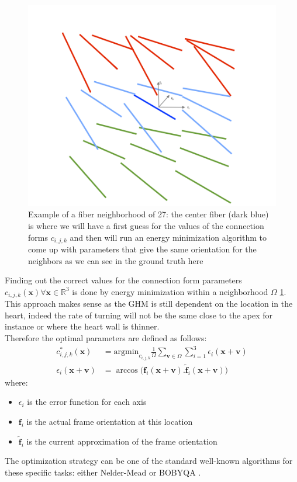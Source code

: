 \begin{figure}[h!]
    \centering
    \includegraphics[width=.5\textwidth]{figures/fibers_neighborhood3d}
    \caption{Example of a fiber neighborhood of 27: the center fiber (dark blue) is where we will have a first guess for the values of the connection forms $c_{i,j,k}$ and then will run an energy minimization algorithm to come up with parameters that give the same orientation for the neighbors as we can see in the ground truth here}
    \label{fig:fibers_neighborhood3d}
\end{figure}

Finding out the correct values for the connection form parameters $c_{i,j,k}(\mathbf{x}) \forall \mathbf{x} \in \mathbb{R}^3$ is done by energy minimization within a neighborhood $\Omega$ \ref{fig:fibers_neighborhood3d}. This approach makes sense as the GHM is still dependent on the location in the heart, indeed the rate of turning will not be the same close to the apex for instance or where the heart wall is thinner.\\
Therefore the optimal parameters are defined as follows:
\begin{align*}
    c^*_{i,j,k}(\mathbf{x}) &= \text{argmin}_{c_{i,j,k}} \frac{1}{\Omega} \sum_{\mathbf{v} \in \Omega} \sum_{i = 1}^3 \epsilon_i(\mathbf{x} + \mathbf{v}) \\
    \epsilon_i(\mathbf{x} + \mathbf{v}) &= \arccos \Big( \mathbf{f}_i(\mathbf{x} + \mathbf{v}) . \mathbf{\tilde{f}}_i(\mathbf{x} + \mathbf{v}) \Big)
\end{align*}
where:
\begin{itemize}
    \item $\epsilon_i$ is the error function for each axis 
    \item $\mathbf{f}_i$ is the actual frame orientation at this location
    \item $\mathbf{\tilde{f}}_i$ is the current approximation of the frame orientation
\end{itemize}
The optimization strategy can be one of the standard well-known algorithms for these specific tasks: either Nelder-Mead \cite{press2007numerical} or BOBYQA \cite{powell2009bobyqa}.

